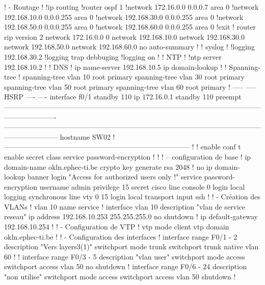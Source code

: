 \documentclass{article}
\begin{document}
\begin{verbatimtab}[4]
! - Routage
!
!ip routing
!router ospf 1
!network 172.16.0.0 0.0.0.7 area 0
!network 192.168.10.0 0.0.0.255 area 0
!network 192.168.30.0 0.0.0.255 area 0
!network 192.168.50.0 0.0.0.255 area 0 
!network 192.168.60.0 0.0.0.255 area 0 
!exit      
!   
router rip
version 2 
network 172.16.0.0 0
network 192.168.10.0 
network 192.168.30.0 
network 192.168.50.0  
network 192.168.60.0
no auto-summary
!
! syslog
!
!logging 192.168.30.2
!logging trap debbuging
!logging on
!
! NTP
!
!ntp server 192.168.10.2
! 
! DNS
!
ip name-server 192.168.10.5
ip domain-lookup
!
! Spanning-tree
!
spanning-tree vlan 10 root primary  
spanning-tree vlan 30 root primary 
spanning-tree vlan 50 root primary
spanning-tree vlan 60 root primary  
!
-----
-----
HSRP
----
----
interface f0/1
standby 110 ip 172.16.0.1
standby 110 preempt
----------------------------------------------------------------------------------------------------------------------------------
-----------------------------------------------------------------------------------------------------------------------------------
hostname SW02
! ------------------------------------------------------------------------------
!
!
enable
conf t
enable secret class 
service password-encryption
!
!
! – configuration de base 
!
ip domain-name okln.ephec-ti.be
crypto key generate rsa
2048
!
no ip domain-lookup
banner login "Access for authorized users only !"
service password-encryption
username admin privilege 15 secret cisco
line console 0
  login local
  logging synchronous
line vty 0 15
  login local 
  transport input ssh
!
! - Création des VLANs
!
vlan 10
  name service
!
interface vlan 10
  description "vlan de service reseau"
  ip address 192.168.10.253 255.255.255.0
  no shutdown
!
ip default-gateway 192.168.10.254
!
! - Configuration de VTP
!
vtp mode client
vtp domain okln.ephec-ti.be
!
! - Configuration des interfaces
!       
interface range F0/1 - 2
  description "Vers layers3(1)"
  switchport mode trunk
  switchport trunk native vlan 60
! 
!
interface range F0/3 - 5
  description "vlan user"
  switchport mode access
  switchport access vlan 50
   no shutdown
!
interface range F0/6 - 24
  description "non utilise"
  switchport mode access
  switchport access vlan 50
  shutdown
!


\end{verbatimtab}
\end{document}
